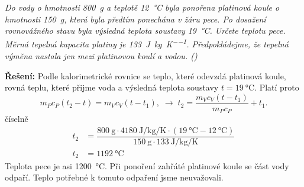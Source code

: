 \begin{mdframed}[style=mdexam]
  \begin{example}\label{FYZ:exam033}
    \emph{Do vody o hmotnosti \SI{800}{\g} a teplotě \SI{12}{\degreeCelsius} byla ponořena platinová
    koule o hmotnosti \SI{150}{\g}, která byla předtím ponechána v žáru pece. Po dosažení
    rovnovážného stavu byla výsledná teplota soustavy \SI{19}{\degreeCelsius}. Určete teplotu pece.
    Měrná tepelná kapacita platiny je \SI{133}{\joule\per\kg\per\kelvin}. Předpokládejme, že tepelná
    výměna nastala jen mezi platinovou koulí a vodou. (\cite[s.~34]{Bartuska1997})}
    
    \textbf{Řešení:}\newline 
    Podle kalorimetrické rovnice se teplo, které odevzdá platinová koule, rovná teplu, které přijme
    voda a výsledná teplota soustavy \(t=\SI{19}{\degreeCelsius}\). Platí proto
    \begin{equation*}
      m_Pc_P(t_2 - t) = m_Vc_V(t-t_1), \;\rightarrow\; t_2 = \dfrac{m_Vc_V(t - t_1)}{m_Pc_P} + t_1.
    \end{equation*}
    číselně
    \begin{align*}
      t_2 &= \dfrac{\SI{800}{\g}\cdot\SI{4180}{\joule\per\kg\per\kelvin}          %
              \cdot(\SI{ 19}{\degreeCelsius} - \SI{12}{\degreeCelsius})}
                   {\SI{150}{\g}\cdot\SI{133}{\joule\per\kg\per\kelvin}}          \\
      t_2 &=\SI{1192}{\degreeCelsius}
    \end{align*}
    Teplota pece je asi \SI{1200}{\degreeCelsius}. Při ponoření zahřáté platinové koule se část vody
    odpaří. Teplo potřebné k tomuto odpaření jsme neuvažovali.  
  \end{example} 
\end{mdframed}